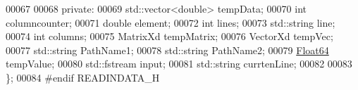 \begin{DoxyCode}
00067 
00068 \textcolor{keyword}{private}:
00069     std::vector<double> tempData;
00070     \textcolor{keywordtype}{int} columncounter;
00071     \textcolor{keywordtype}{double} element;
00072     \textcolor{keywordtype}{int} lines;
00073     std::string line;
00074     \textcolor{keywordtype}{int} columns;
00075     MatrixXd tempMatrix;
00076     VectorXd tempVec;
00077     std::string PathName1;
00078     std::string PathName2;
00079     \hyperlink{group___tools_ga3f1431cb9f76da10f59246d1d743dc2c}{Float64} tempValue;
00080     std::fstream input;
00081     std::string currtenLine;
00082 
00083 \};
00084 \textcolor{preprocessor}{#endif READINDATA\_H}
\end{DoxyCode}
